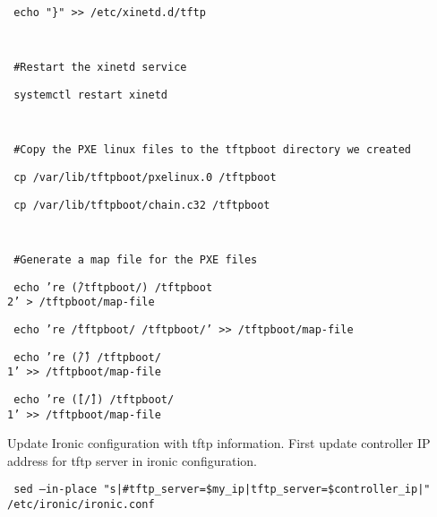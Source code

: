 \documentclass[12pt]{article}
\begin{document}
\begin{bash}\texttt{\small{ echo "\}" >> /etc/xinetd.d/tftp}}\end{bash}
\begin{bash}\texttt{\small{ }}\end{bash}
\begin{bash}\texttt{\small{ \#Restart the xinetd service}}\end{bash}
\begin{bash}\texttt{\small{ systemctl restart xinetd}}\end{bash}
\begin{bash}\texttt{\small{     }}\end{bash}
\begin{bash}\texttt{\small{ \#Copy the PXE linux files to the tftpboot directory we created}}\end{bash}
\begin{bash}\texttt{\small{ cp /var/lib/tftpboot/pxelinux.0 /tftpboot}}\end{bash}
\begin{bash}\texttt{\small{ cp /var/lib/tftpboot/chain.c32 /tftpboot}}\end{bash}
\begin{bash}\texttt{\small{     }}\end{bash}
\begin{bash}\texttt{\small{ \#Generate a map file for the PXE files}}\end{bash}
\begin{bash}\texttt{\small{ echo 're \^(/tftpboot/) /tftpboot\\2' > /tftpboot/map-file}}\end{bash}
\begin{bash}\texttt{\small{ echo 're \^/tftpboot/ /tftpboot/' >> /tftpboot/map-file}}\end{bash}
\begin{bash}\texttt{\small{ echo 're \^(\^/) /tftpboot/\\1' >> /tftpboot/map-file}}\end{bash}
\begin{bash}\texttt{\small{ echo 're \^([\^/]) /tftpboot/\\1' >> /tftpboot/map-file}}\end{bash}

Update Ironic configuration with tftp information. First update controller IP address for tftp server in ironic configuration.

\begin{bash}\texttt{\small{ sed --in-place "s|\#tftp\_server=\$my\_ip|tftp\_server=\${controller\_ip}|" /etc/ironic/ironic.conf}}\end{bash}
\end{document}
